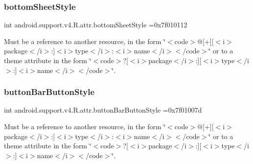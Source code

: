 \subsubsection{\texorpdfstring{bottom\+Sheet\+Style}{bottomSheetStyle}}
{\footnotesize\ttfamily int android.\+support.\+v4.\+R.\+attr.\+bottom\+Sheet\+Style =0x7f010112\hspace{0.3cm}{\ttfamily [static]}}

Must be a reference to another resource, in the form \char`\"{}$<$code$>$@\mbox{[}+\mbox{]}\mbox{[}$<$i$>$package$<$/i$>$\+:\mbox{]}$<$i$>$type$<$/i$>$\+:$<$i$>$name$<$/i$>$$<$/code$>$\char`\"{} or to a theme attribute in the form \char`\"{}$<$code$>$?\mbox{[}$<$i$>$package$<$/i$>$\+:\mbox{]}\mbox{[}$<$i$>$type$<$/i$>$\+:\mbox{]}$<$i$>$name$<$/i$>$$<$/code$>$\char`\"{}. \mbox{\label{classandroid_1_1support_1_1v4_1_1R_1_1attr_a54c7f8bd105cdf2413596e8264b907c6}} 
\subsubsection{\texorpdfstring{button\+Bar\+Button\+Style}{buttonBarButtonStyle}}
{\footnotesize\ttfamily int android.\+support.\+v4.\+R.\+attr.\+button\+Bar\+Button\+Style =0x7f01007d\hspace{0.3cm}{\ttfamily [static]}}

Must be a reference to another resource, in the form \char`\"{}$<$code$>$@\mbox{[}+\mbox{]}\mbox{[}$<$i$>$package$<$/i$>$\+:\mbox{]}$<$i$>$type$<$/i$>$\+:$<$i$>$name$<$/i$>$$<$/code$>$\char`\"{} or to a theme attribute in the form \char`\"{}$<$code$>$?\mbox{[}$<$i$>$package$<$/i$>$\+:\mbox{]}\mbox{[}$<$i$>$type$<$/i$>$\+:\mbox{]}$<$i$>$name$<$/i$>$$<$/code$>$\char`\"{}. \mbox{\label{classandroid_1_1support_1_1v4_1_1R_1_1attr_ab49f2526f5dcee871d94e0c224825433}} 
